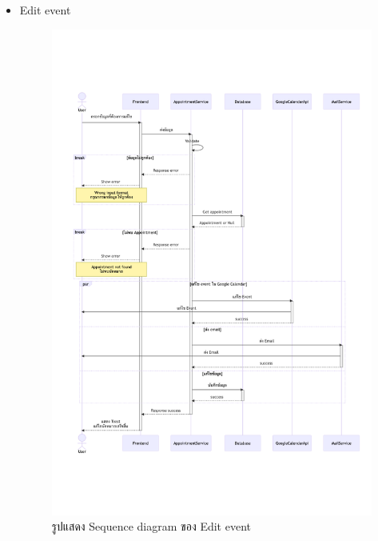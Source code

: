 \documentclass[12pt,oneside,openright,a4paper]{cpe-thai-project}
\begin{document}
\begin{itemize}
    \newpage
    \item Edit event \\
    \begin{figure}[!ht]\centering
        \includegraphics[width=13cm, trim={0 5cm 0 5cm},clip]{./assets/sequence-diagram/edit-event.png}
        \caption{รูปแสดง Sequence diagram ของ Edit event}\label{fig:sqEditEvent}
    \end{figure}


\end{itemize}
\end{document}
